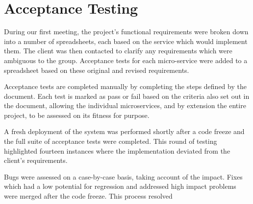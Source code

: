 \section{Acceptance Testing}
\par
During our first meeting, the project's functional requirements were broken down into a number of spreadsheets, each based on the service which would implement them. The client was then contacted to clarify any requirements which were ambiguous to the group. Acceptance tests for each micro-service were added to a spreadsheet based on these original and revised requirements.

\par
Acceptance tests are completed manually by completing the steps defined by the document. Each test is marked as pass or fail based on the criteria also set out in the document, allowing the individual microservices, and by extension the entire project, to be assessed on its fitness for purpose.

\par
A fresh deployment of the system was performed shortly after a code freeze and the full suite of acceptance tests were completed. This round of testing highlighted fourteen instances where the implementation deviated from the client's requirements.

\par
Bugs were assessed on a case-by-case basis, taking account of the impact. Fixes which had a low potential for regression and addressed high impact problems were merged after the code freeze. This process resolved %

\par

